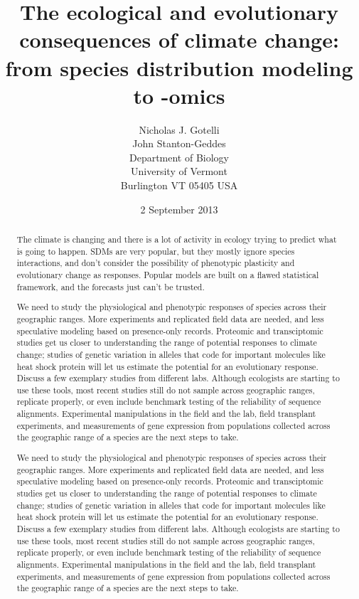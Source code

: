 \documentclass{article}
\author{Nicholas J. Gotelli\\
        John Stanton-Geddes\\
        Department of Biology\\
        University of Vermont\\
        Burlington VT 05405 USA}
\title{The ecological and evolutionary consequences of climate change: from species distribution modeling to -omics}
\date{2 September 2013} %
\begin{document}
\maketitle
\begin{abstract}
The climate is changing and there is a lot of activity in ecology trying to predict what is going to happen. SDMs are very popular, but they mostly ignore species interactions, and don't consider the possibility of phenotypic plasticity and evolutionary change as responses. Popular models are built on a flawed statistical framework, and the forecasts just can't be trusted.

We need to study the physiological and phenotypic responses of species across their geographic ranges. More experiments and replicated field data are needed, and less speculative modeling based on presence-only records. Proteomic and transciptomic studies get us closer to understanding the range of  potential responses to climate change; studies of genetic variation in alleles that code for important molecules like heat shock protein will let us estimate the potential for an evolutionary response. Discuss a few exemplary studies from different labs. Although ecologists are starting to use these tools, most recent studies still do not sample across geographic ranges, replicate properly, or even include benchmark testing of the reliability of sequence alignments. Experimental manipulations in the field and the lab, field transplant experiments, and measurements of gene expression from populations collected across the geographic range of a species are the next steps to take.

We need to study the physiological and phenotypic responses of species across their geographic ranges. More experiments and replicated field data are needed, and less speculative modeling based on presence-only records. Proteomic and transciptomic studies get us closer to understanding the range of  potential responses to climate change; studies of genetic variation in alleles that code for important molecules like heat shock protein will let us estimate the potential for an evolutionary response. Discuss a few exemplary studies from different labs. Although ecologists are starting to use these tools, most recent studies still do not sample across geographic ranges, replicate properly, or even include benchmark testing of the reliability of sequence alignments. Experimental manipulations in the field and the lab, field transplant experiments, and measurements of gene expression from populations collected across the geographic range of a species are the next steps to take. 
\end{abstract}
\end{document}
